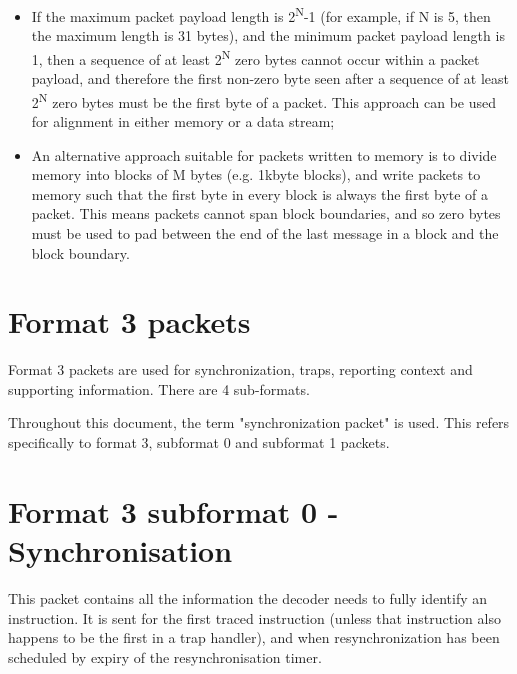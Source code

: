 \begin{itemize}
  \item If the maximum packet payload length is 2\textsuperscript{N}-1 (for example, if N is 5, then the maximum length is
    31 bytes), and the minimum packet payload length is 1, then a sequence of at least 2\textsuperscript{N} zero 
    bytes cannot occur within a packet payload, and therefore the first non-zero byte seen after a sequence of 
    at least 2\textsuperscript{N} zero bytes must be the first byte of a packet.  This approach can be used for
    alignment in either memory or a data stream;
  \item An alternative approach suitable for packets written to memory is to divide memory into blocks of M bytes
    (e.g. 1kbyte blocks), and write packets to memory such that the first byte in every block is always the first
    byte of a packet.  This means packets cannot span block boundaries, and so zero bytes must be used to pad between 
    the end of the last message in a block and the block boundary.
\end{itemize}

\section{Format 3 packets} \label{sec:format3}

Format 3 packets are used for synchronization, traps, reporting context and supporting information.  
There are 4 sub-formats.

Throughout this document, the term "synchronization packet" is used.  This refers specifically to format 3, 
subformat 0 and subformat 1 packets.

\section{Format 3 subformat 0 - Synchronisation} \label{sec:format30}

This packet contains all the information the decoder needs to fully identify an instruction.  It is sent for
the first traced instruction (unless that instruction also happens to be the first in a trap handler), 
and when resynchronization has been scheduled by expiry of the resynchronisation timer.

